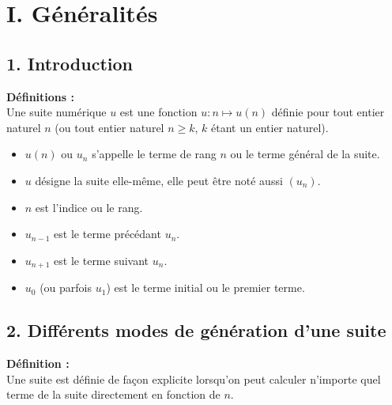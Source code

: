 \documentclass[11pt,a4paper]{article}
\title{\doctitre}
\author{\docniveau \\ \doctheme - \doctype}
\date{}
\begin{document}
\maketitle
\pagestyle{custom}
\thispagestyle{custom}

\section*{I. Généralités}
\subsection*{1. Introduction}

\begin{mdframed}[style=definitionStyle]
  \textbf{Définitions :} ~\\
  Une suite numérique $u$ est une fonction $u:n \mapsto u(n)$ définie pour tout entier naturel $n$
  (ou tout entier naturel $n \geq k$, $k$ étant un entier naturel).
  \vspace{-4pt}
  \begin{itemize}
    \item  $u(n)$ ou $u_n$ s'appelle le terme de rang $n$ ou le terme général de la suite.
    \item  $u$ désigne la suite elle-même, elle peut être noté aussi $(u_n)$.
    \item  $n$ est l'indice ou le rang.
    \item  $u_{n-1}$ est le terme précédant $u_n$.
    \item  $u_{n+1}$ est le terme suivant $u_n$.
    \item  $u_0$ (ou parfois $u_1$) est le terme initial ou le premier terme.
  \end{itemize}

\end{mdframed}

\subsection*{2. Différents modes de génération d'une suite}

\begin{mdframed}[style=definitionStyle]
  \textbf{Définition :} ~\\
  Une suite est définie de façon explicite lorsqu'on peut calculer n'importe quel terme de la suite directement en fonction de $n$.
\end{mdframed}
\end{document}
